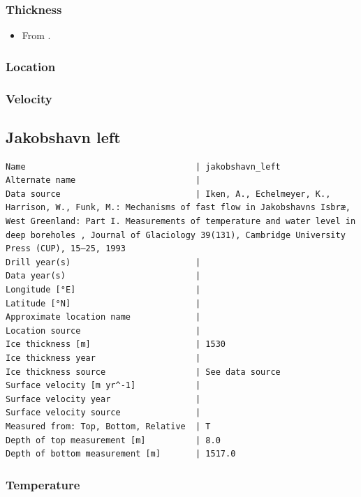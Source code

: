 \documentclass[article,a4paper,times,11pt,twoside]{article}
\begin{document}
\subsubsection{Thickness}
\label{sec:org7cff126}

\begin{itemize}
\item From \textcite{iken_1993}.
\end{itemize}

\subsubsection{Location}
\label{sec:org1b952cb}

\subsubsection{Velocity}
\label{sec:org89eb28a}
\clearpage
\subsection{Jakobshavn left}
\label{sec:org4aabbd5}
\begin{verbatim}
Name                                  | jakobshavn_left
Alternate name                        | 
Data source                           | Iken, A., Echelmeyer, Κ., Harrison, W., Funk, M.: Mechanisms of fast flow in Jakobshavns Isbræ, West Greenland: Part I. Measurements of temperature and water level in deep boreholes , Journal of Glaciology 39(131), Cambridge University Press (CUP), 15–25, 1993 
Drill year(s)                         | 
Data year(s)                          | 
Longitude [°E]                        | 
Latitude [°N]                         | 
Approximate location name             | 
Location source                       | 
Ice thickness [m]                     | 1530
Ice thickness year                    | 
Ice thickness source                  | See data source
Surface velocity [m yr^-1]            | 
Surface velocity year                 | 
Surface velocity source               | 
Measured from: Top, Bottom, Relative  | T
Depth of top measurement [m]          | 8.0
Depth of bottom measurement [m]       | 1517.0
\end{verbatim}

\subsubsection{Temperature}
\label{sec:org1cf2b7f}
\end{document}
